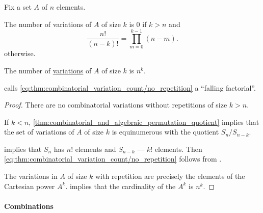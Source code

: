 \begin{proposition}\label{thm:combinatorial_variation_count}
  Fix a set \( A \) of \( n \) elements.

  \begin{thmenum}
     The number of variations of \( A \) of size \( k \)  is \( 0 \) if \( k > n \) and
    \begin{equation}\label{eq:thm:combinatorial_variation_count/no_repetition}
      \frac {n!} {(n - k)!} = \prod_{m=0}^{k - 1} (n - m).
    \end{equation}
    otherwise.

     The number of \hyperref[def:combinatorial_variation]{variations} of \( A \) of size \( k \)  is \( n^k \).
  \end{thmenum}
\end{proposition}
\begin{comments}
  \item {} calls \eqref{eq:thm:combinatorial_variation_count/no_repetition} a \enquote{falling factorial}.
\end{comments}
\begin{proof}
   There are no combinatorial variations without repetitions of size \( k > n \).

  If \( k < n \), \cref{thm:combinatorial_and_algebraic_permutation_quotient} implies that the set of variations of \( A \) of size \( k \) is equinumerous with the quotient \( S_n / S_{n - k} \).

   implies that \( S_n \) has \( n! \) elements and \( S_{n - k} \) --- \( k! \) elements. Then \eqref{eq:thm:combinatorial_variation_count/no_repetition} follows from .

   The variations in \( A \) of size \( k \) with repetition are precisely the elements of the Cartesian power \( A^k \).  implies that the cardinality of the \( A^k \) is \( n^k \).
\end{proof}

\paragraph{Combinations}

